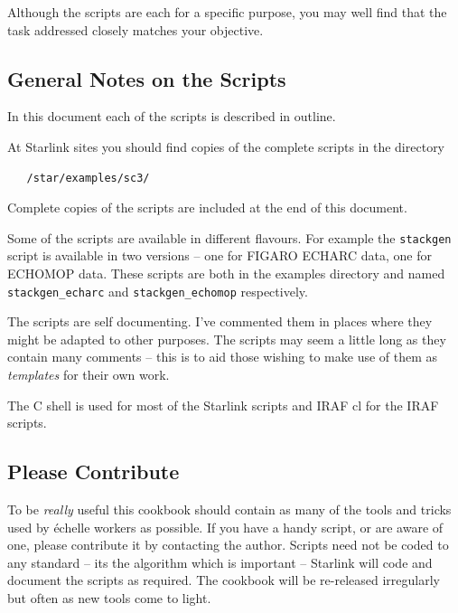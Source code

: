 \documentclass[twoside,11pt]{article}
\newcommand{\xref}[3]{#1}
\newcommand{\xlabel}[1]{}
\newcommand{\scspec}[2]{#1}
\newcommand{\scspec}[2]{#2}
\begin{document}
Although the scripts are each for a specific purpose, you may well find that
the task addressed closely matches your objective.

\subsection{\xlabel{general_notes}General Notes on the Scripts }

In this document each of the scripts is described in outline.

At Starlink sites you should find copies of the complete scripts in the
directory

\begin{verbatim}
   /star/examples/sc3/
\end{verbatim}

\begin{htmlonly}
Complete copies of the scripts are included at the end of this document.
\end{htmlonly}

Some of the scripts are available in different flavours.  For example
the \verb+stackgen+ script is available in two versions \scspec{--}{-}
one for \xref{FIGARO}{sun86}{} \xref{ECHARC}{sun86}{ECHARC} data, one for
ECHOMOP data.  These scripts are both in the examples directory and named
\verb+stackgen_echarc+ and \verb+stackgen_echomop+ respectively.

The scripts are self documenting.
I've commented them in places where they might be adapted to other
purposes.
The scripts may seem a little long as they contain many comments
\scspec{--}{-} this is to aid those wishing to make use of them as
{\em templates} for their own work.

The C shell is used for most of the Starlink scripts and IRAF cl for the
IRAF scripts.


\subsection{\xlabel{please_contribute}Please Contribute }

To be {\em really} useful this cookbook should contain as many of the
tools and tricks used by \'{e}chelle workers as possible.
If you have a handy script, or are aware of one, please contribute it by
contacting the author.
Scripts need not be coded to any standard \scspec{--}{-} its the algorithm
which is important \scspec{--}{-} Starlink will code and document the scripts
as required.
The cookbook will be re-released irregularly but often as new tools come to
light.
\end{document}
